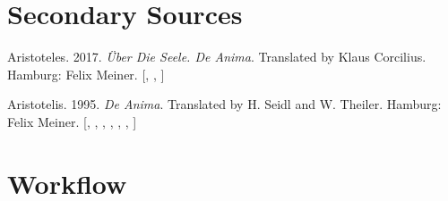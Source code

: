 \documentclass[
  12pt,
  a4paper,
  oneside]{scrbook}
\newlength{\cslhangindent}
\newlength{\cslentryspacingunit} %
\newenvironment{CSLReferences}[2] %
 {%
  \setlength{\parindent}{0pt}
  \ifodd #1
  \let\oldpar\par
  \def\par{\hangindent=\cslhangindent\oldpar}
  \fi
  \setlength{\parskip}{#2\cslentryspacingunit}
 }%
 {}
\begin{document}
\hypertarget{secondary-sources}{%
\chapter*{Secondary Sources}\label{secondary-sources}}

\protect\hypertarget{scriv34}{}{}

\hypertarget{refs_multibib34}{}
\begin{CSLReferences}{1}{0}
\leavevmode{}%
Aristoteles. 2017. \emph{Über Die Seele. De Anima}. Translated by Klaus
Corcilius. Hamburg: Felix Meiner.
{[},
\protect\hyperlink{cite_67}{\pageref{cite_67}},
\protect\hyperlink{cite_68}{\pageref{cite_68}}{]}

\leavevmode{}%
Aristotelis. 1995. \emph{De Anima}. Translated by H. Seidl and W.
Theiler. Hamburg: Felix Meiner.
{[},
\protect\hyperlink{cite_45}{\pageref{cite_45}},
\protect\hyperlink{cite_46}{\pageref{cite_46}},
\protect\hyperlink{cite_55}{\pageref{cite_55}},
\protect\hyperlink{cite_56}{\pageref{cite_56}},
\protect\hyperlink{cite_63}{\pageref{cite_63}},
\protect\hyperlink{cite_64}{\pageref{cite_64}}{]}

\end{CSLReferences}

\hypertarget{workflow}{%
\chapter*{Workflow}\label{workflow}}

\protect\hypertarget{scriv35}{}{}
\end{document}
